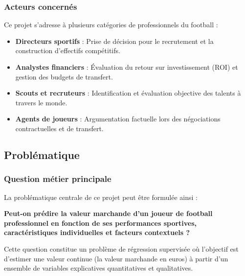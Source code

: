 \documentclass[12pt,a4paper]{article}
\begin{document}
\subsubsection{Acteurs concernés}

Ce projet s'adresse à plusieurs catégories de professionnels du football :

\begin{itemize}[leftmargin=*]
    \item \textbf{Directeurs sportifs} : Prise de décision pour le recrutement et la construction d'effectifs compétitifs.
    \item \textbf{Analystes financiers} : Évaluation du retour sur investissement (ROI) et gestion des budgets de transfert.
    \item \textbf{Scouts et recruteurs} : Identification et évaluation objective des talents à travers le monde.
    \item \textbf{Agents de joueurs} : Argumentation factuelle lors des négociations contractuelles et de transfert.
\end{itemize}

\newpage

\subsection{Problématique}

\subsubsection{Question métier principale}

La problématique centrale de ce projet peut être formulée ainsi :

\begin{tcolorbox}[colback=accentcolor!5,colframe=accentcolor,width=\textwidth,arc=2mm,boxrule=1pt]
    \centering
    \Large\bfseries
    \textcolor{maincolor}{Peut-on prédire la valeur marchande d'un joueur de football professionnel en fonction de ses performances sportives, caractéristiques individuelles et facteurs contextuels ?}
\end{tcolorbox}

\vspace{0.5cm}

Cette question constitue un problème de régression supervisée où l'objectif est d'estimer une valeur continue (la valeur marchande en euros) à partir d'un ensemble de variables explicatives quantitatives et qualitatives.
\end{document}
